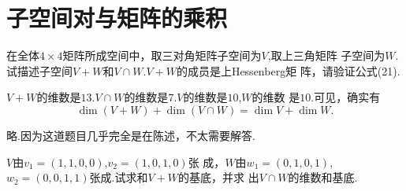 ﻿\documentclass{book} \usepackage{exsheets} \usepackage{xeCJK}
\begin{document}
\section{子空间对与矩阵的乘积}
\begin{question}
  在全体$4\times 4$矩阵所成空间中，取三对角矩阵子空间为$V$,取上三角矩阵
  子空间为$W$.试描述子空间$V+W$和$V\cap W$.$V+W$的成员是上Hessenberg矩
  阵，请验证公式(21).
\end{question}
\begin{solution}
  $V+W$的维数是$13$.$V\cap W$的维数是$7$.$V$的维数是$10$,$W$的维数
  是$10$.可见，确实有
$$
\dim (V+W)+\dim (V\cap W)=\dim V+\dim W.
$$
\end{solution}
\begin{question}
  略.因为这道题目几乎完全是在陈述，不太需要解答.
\end{question}
\begin{question}
  $V$由$v_1=(1,1,0,0)$,$v_2=(1,0,1,0)$张
  成，$W$由$w_1=(0,1,0,1)$,$w_2=(0,0,1,1)$张成.试求和$V+W$的基底，并求
  出$V\cap W$的维数和基底.
\end{question}
\end{document}
